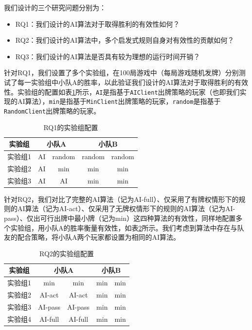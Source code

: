 \documentclass[a4paper]{ctexart}
\begin{document}
我们设计的三个研究问题分别为：
\begin{itemize}
	\item RQ1：我们设计的AI算法对于取得胜利的有效性如何？
	\item RQ2：我们设计的AI算法中，多个启发式规则自身对有效性的贡献如何？
	\item RQ3：我们设计的AI算法是否具有较为理想的运行时间开销？
\end{itemize}

针对RQ1，我们设置了多个实验组，在100局游戏中（每局游戏随机发牌）分别测试了每一实验组中小队A的胜率，以此验证我们设计的AI算法对于取得胜利的有效性。实验组的配置如表\ref{RQ1_config}所示，\texttt{AI}是指基于\texttt{AIClient}出牌策略的玩家（也即我们实现的AI算法），\texttt{min}是指基于\texttt{MinClient}出牌策略的玩家，\texttt{random}是指基于\texttt{RandomClient}出牌策略的玩家。

\begin{table}
	\centering 
	\caption{RQ1的实验组配置}
	\label{RQ1_config}
	\begin{tabular}{|c|c|c|c|c|}
		\hline
		实验组   & \multicolumn{2}{c|}{小队A} & \multicolumn{2}{c|}{小队B} \\ \hline
		实验组1 & AI        & random       & random      & random     \\ \hline
		实验组2 & AI        & min          & min         & min        \\ \hline
		实验组3 & AI        & AI           & min         & min        \\ \hline
	\end{tabular}
\end{table}

针对RQ2，我们对比了完整的AI算法（记为AI-full）、仅采用了有牌权情形下的规则的AI算法（记为AI-act）、仅采用了无牌权情形下的规则的AI算法（记为AI-pass）、仅出可行出牌中最小牌（记为min）这四种算法的有效性，同样地配置多个实验组，用小队A的胜率衡量有效性，如表\ref{RQ2_config}所示。我们考虑到算法中存在与队友的配合策略，将小队A两个玩家都设置为相同的AI算法。

\begin{table}
	\centering 
	\caption{RQ2的实验组配置}
	\label{RQ2_config}
	\begin{tabular}{|c|c|c|c|c|}
		\hline
		实验组   & \multicolumn{2}{c|}{小队A} & \multicolumn{2}{c|}{小队B} \\ \hline
		实验组1 & min        & min       & min      & min     \\ \hline
		实验组2 & AI-act        &    AI-act       & min         & min        \\ \hline
		实验组3 & AI-pass       & AI-pass           & min         & min        \\ \hline
		实验组4 & AI-full & AI-full & min & min \\ \hline
	\end{tabular}
\end{table}
\end{document}
